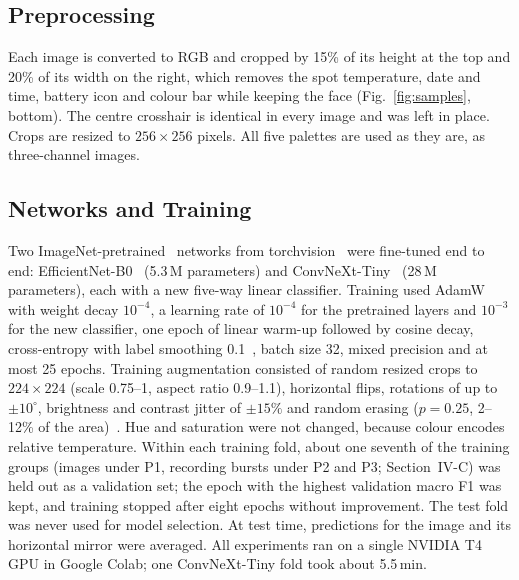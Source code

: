 \documentclass[10pt,twocolumn,letterpaper]{article}
\begin{document}
\subsection{Preprocessing}
Each image is converted to RGB and cropped by 15\% of its height at the top and 20\% of its width on the right, which removes the spot temperature, date and time, battery icon and colour bar while keeping the face (Fig.~\ref{fig:samples}, bottom). The centre crosshair is identical in every image and was left in place. Crops are resized to $256\times256$ pixels. All five palettes are used as they are, as three-channel images.

\subsection{Networks and Training}
Two ImageNet-pretrained~\cite{imagenet} networks from torchvision~\cite{pytorch} were fine-tuned end to end: EfficientNet-B0~\cite{efficientnet} (5.3\,M parameters) and ConvNeXt-Tiny~\cite{convnext} (28\,M parameters), each with a new five-way linear classifier. Training used AdamW~\cite{adamw} with weight decay $10^{-4}$, a learning rate of $10^{-4}$ for the pretrained layers and $10^{-3}$ for the new classifier, one epoch of linear warm-up followed by cosine decay, cross-entropy with label smoothing 0.1~\cite{szegedy2016}, batch size 32, mixed precision and at most 25 epochs. Training augmentation consisted of random resized crops to $224\times224$ (scale 0.75--1, aspect ratio 0.9--1.1), horizontal flips, rotations of up to $\pm10^\circ$, brightness and contrast jitter of $\pm15\%$ and random erasing ($p=0.25$, 2--12\% of the area)~\cite{zhong2020}. Hue and saturation were not changed, because colour encodes relative temperature. Within each training fold, about one seventh of the training groups (images under P1, recording bursts under P2 and P3; Section~IV-C) was held out as a validation set; the epoch with the highest validation macro F1 was kept, and training stopped after eight epochs without improvement. The test fold was never used for model selection. At test time, predictions for the image and its horizontal mirror were averaged. All experiments ran on a single NVIDIA T4 GPU in Google Colab; one ConvNeXt-Tiny fold took about 5.5\,min.
\end{document}
